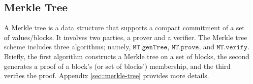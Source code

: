 

\vspace{-1.2mm}

\subsection{Merkle Tree}\label{sec::merkle-tree-short}
\vspace{-.5mm}

A Merkle tree is a data structure that supports a compact commitment of a set of values/blocks.  It involves two parties, a prover and a verifier. 
%
The Merkle tree scheme includes three algorithms; namely, $\mathtt{MT.genTree}$, $ \mathtt{MT.prove}$, and  $\mathtt{MT.verify}$. Briefly, the first algorithm constructs a Merkle tree on a set of blocks, the second generates a proof of a block's (or set of blocks') membership, and the third verifies the proof. Appendix \ref{sec::merkle-tree} provides more details. 

